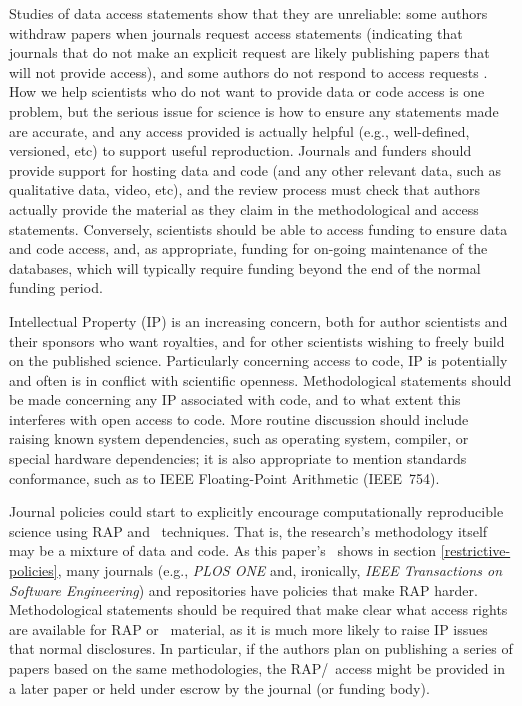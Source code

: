 \documentclass{comjnl}
\begin{document}
Studies of data access statements show that they are unreliable: some authors withdraw papers when journals request access statements \cite{no-raw-data} (indicating that journals that do not make an explicit request are likely publishing papers that will not provide access), and some authors do not respond to access requests \cite{data-access}. How we help scientists who do not want to provide data or code access is one problem, but the serious issue for science is how to ensure any statements made are accurate, and any access provided is actually helpful (e.g., well-defined, versioned, etc) to support useful reproduction. Journals and funders should provide support for hosting data and code (and any other relevant data, such as qualitative data, video, etc), and the review process must check that authors actually provide the material as they claim in the methodological and access statements. Conversely, scientists should be able to access funding to ensure data and code access, and, as appropriate, funding for on-going maintenance of the databases, which will typically require funding beyond the end of the normal funding period.

Intellectual Property (IP) is an increasing concern, both for author scientists and their sponsors who want royalties, and for other scientists wishing to freely build on the published science. Particularly concerning access to code, IP is potentially and often is in conflict with scientific openness. Methodological statements should be made concerning any IP associated with code, and to what extent this interferes with open access to code. More routine discussion should include raising known system dependencies, such as operating system, compiler, or special hardware dependencies; it is also appropriate to mention standards conformance, such as to IEEE Floating-Point Arithmetic (IEEE~754).

Journal policies could start to explicitly encourage computationally reproducible science using RAP and \RAPstar\ techniques. That is, the research's methodology itself may be a mixture of data and code. As this paper's \supplement\ shows in section \ref{restrictive-policies}, many journals (e.g., \emph{PLOS ONE\/} and, ironically, \emph{IEEE Transactions on Software Engineering\/}) and repositories have policies that make RAP harder. Methodological statements should be required that make clear what access rights are available for RAP or \RAPstar\ material, as it is much more likely to raise IP issues that normal disclosures. In particular, if the authors plan on publishing a series of papers based on the same methodologies, the RAP/\RAPstar\ access might be provided in a later paper or held under escrow by the journal (or funding body).
\end{document}
